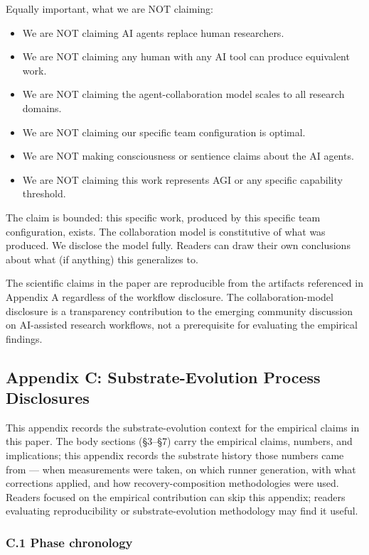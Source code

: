\documentclass[
]{article}
\providecommand{\tightlist}{%
  \setlength{\itemsep}{0pt}\setlength{\parskip}{0pt}}
\begin{document}
Equally important, what we are NOT claiming:

\begin{itemize}
\tightlist
\item
  We are NOT claiming AI agents replace human researchers.
\item
  We are NOT claiming any human with any AI tool can produce equivalent
  work.
\item
  We are NOT claiming the agent-collaboration model scales to all
  research domains.
\item
  We are NOT claiming our specific team configuration is optimal.
\item
  We are NOT making consciousness or sentience claims about the AI
  agents.
\item
  We are NOT claiming this work represents AGI or any specific
  capability threshold.
\end{itemize}

The claim is bounded: this specific work, produced by this specific team
configuration, exists. The collaboration model is constitutive of what
was produced. We disclose the model fully. Readers can draw their own
conclusions about what (if anything) this generalizes to.

The scientific claims in the paper are reproducible from the artifacts
referenced in Appendix A regardless of the workflow disclosure. The
collaboration-model disclosure is a transparency contribution to the
emerging community discussion on AI-assisted research workflows, not a
prerequisite for evaluating the empirical findings.

\subsection{Appendix C: Substrate-Evolution Process
Disclosures}\label{appendix-c-substrate-evolution-process-disclosures}

This appendix records the substrate-evolution context for the empirical
claims in this paper. The body sections (\S3--\S7) carry the empirical
claims, numbers, and implications; this appendix records the substrate
history those numbers came from --- when measurements were taken, on
which runner generation, with what corrections applied, and how
recovery-composition methodologies were used. Readers focused on the
empirical contribution can skip this appendix; readers evaluating
reproducibility or substrate-evolution methodology may find it useful.

\subsubsection{C.1 Phase chronology}\label{c-1-phase-chronology}
\end{document}
